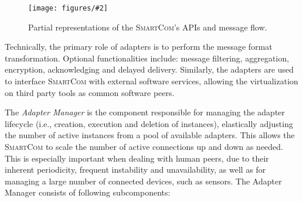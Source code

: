 \documentclass{llncs}
\newcommand{\mdl}{\textsc{SmartCom}}
\newcommand{\figcoltop}[3][0.9]{
\begin{figure}[t] %
\centering
\texttt{[image: figures/\#2]}
\caption{#3}
\label{fig:#2}
\end{figure}
}
\begin{document}

    \figcoltop[0.85]{api}{Partial representations of the \mdl's APIs and message flow.}

    Technically, the primary role of adapters is to perform the message format transformation. Optional functionalities include: message filtering, aggregation, encryption, acknowledging and delayed delivery. Similarly, the adapters are used to interface \mdl{} with external software services, allowing the virtualization on third party tools as common software peers.


    The \emph{Adapter Manager} is the component responsible for managing the adapter lifecycle (i.e., creation, execution and deletion of instances), elastically adjusting the number of active instances from a pool of available adapters. This allows the \mdl{} to scale the number of active connections up and down as needed. This is especially important when dealing with human peers, due to their inherent periodicity, frequent instability and unavailability, as well as for managing a large number of connected devices, such as sensors. The Adapter Manager consists of following subcomponents: 
\end{document}
